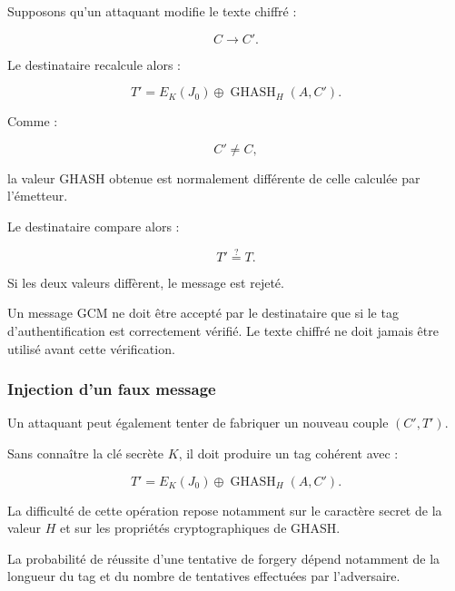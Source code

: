 \documentclass[12pt,a4paper]{article}
\begin{document}
Supposons qu'un attaquant modifie le texte chiffré :

\begin{equation}
C \longrightarrow C'.
\end{equation}

Le destinataire recalcule alors :

\begin{equation}
T' =
E_K(J_0)
\oplus
\operatorname{GHASH}_H(A,C').
\end{equation}

Comme :

\begin{equation}
C' \neq C,
\end{equation}

la valeur GHASH obtenue est normalement différente de celle calculée
par l'émetteur.

Le destinataire compare alors :

\begin{equation}
T' \stackrel{?}{=} T.
\end{equation}

Si les deux valeurs diffèrent, le message est rejeté.

\begin{tcolorbox}[
    colback=gray!5,
    colframe=black!60,
    title=\textbf{Principe de vérification}
]
Un message GCM ne doit être accepté par le destinataire que si le tag
d'authentification est correctement vérifié. Le texte chiffré ne doit
jamais être utilisé avant cette vérification.
\end{tcolorbox}

\subsubsection{Injection d'un faux message}

Un attaquant peut également tenter de fabriquer un nouveau couple
$(C',T')$.

Sans connaître la clé secrète $K$, il doit produire un tag cohérent
avec :

\begin{equation}
T' =
E_K(J_0)
\oplus
\operatorname{GHASH}_H(A,C').
\end{equation}

La difficulté de cette opération repose notamment sur le caractère
secret de la valeur $H$ et sur les propriétés cryptographiques de
GHASH.

La probabilité de réussite d'une tentative de forgery dépend notamment
de la longueur du tag et du nombre de tentatives effectuées par
l'adversaire.
\end{document}
